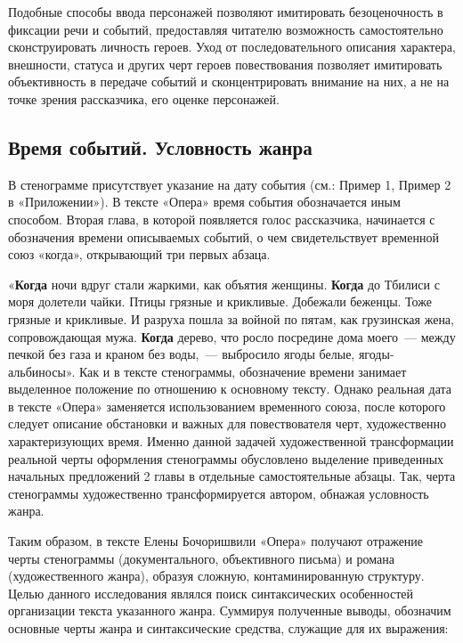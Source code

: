 \documentclass{kursa4}
\begin{document}
        Подобные способы ввода персонажей позволяют имитировать безоценочность в фиксации речи и событий, предоставляя читателю возможность самостоятельно сконструировать личность героев. Уход от последовательного описания характера, внешности, статуса и других черт героев повествования позволяет имитировать объективность в передаче событий и сконцентрировать внимание на них, а не на точке зрения рассказчика, его оценке персонажей. 

      \subsection{Время событий. Условность жанра}

        В стенограмме присутствует указание на дату события (см.: Пример 1, Пример 2 в «Приложении»). В тексте «Опера» время события обозначается иным способом. Вторая глава, в которой появляется голос рассказчика, начинается с обозначения времени описываемых событий, о чем свидетельствует временной союз «когда», открывающий три первых абзаца. 

        «\textbf{Когда} ночи вдруг стали жаркими, как объятия женщины. \textbf{Когда} до Тбилиси с моря долетели чайки. Птицы грязные и крикливые. Добежали беженцы. Тоже грязные и крикливые. И разруха пошла за войной по пятам, как грузинская жена, сопровождающая мужа. \textbf{Когда} дерево, что росло посредине дома моего~--- между печкой без газа и краном без воды,~--- выбросило ягоды белые, ягоды-альбиносы». Как и в тексте стенограммы, обозначение времени занимает выделенное положение по отношению к основному тексту. Однако реальная дата в тексте «Опера» заменяется использованием временного союза, после которого следует описание обстановки и важных для повествователя черт, художественно характеризующих время. Именно данной задачей художественной трансформации реальной черты оформления стенограммы обусловлено выделение приведенных начальных предложений 2 главы в отдельные самостоятельные абзацы. Так, черта стенограммы художественно трансформируется автором, обнажая условность жанра. 

  Таким образом, в тексте Елены Бочоришвили «Опера» получают отражение черты стенограммы (документального, объективного письма) и романа (художественного жанра), образуя сложную, контаминированную структуру. Целью данного исследования являлся поиск синтаксических особенностей организации текста указанного жанра. Суммируя полученные выводы, обозначим основные черты жанра и синтаксические средства, служащие для их выражения:  
\end{document}
